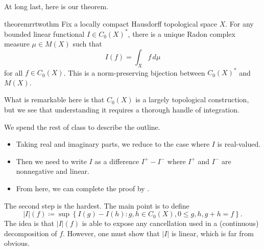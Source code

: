 \documentclass[../notes.tex]{subfiles}
\begin{document}
At long last, here is our theorem.
\begin{restatable}{theorem}{rrtwothm} \label{thm:rr-2}
	Fix a locally compact Hausdorff topological space $X$. For any bounded linear functional $I\in C_0(X)^*$, there is a unique Radon complex measure $\mu\in M(X)$ such that
	\[I(f)=\int_Xf\,d\mu\]
	for all $f\in C_0(X)$. This is a norm-preserving bijection between $C_0(X)^*$ and $M(X)$.
\end{restatable}
\noindent What is remarkable here is that $C_0(X)$ is a largely topological construction, but we see that understanding it requires a thorough handle of integration.

We spend the rest of class to describe the outline.
\begin{itemize}
	\item Taking real and imaginary parts, we reduce to the case where $I$ is real-valued.
	\item Then we need to write $I$ as a difference $I^+-I^-$ where $I^+$ and $I^-$ are nonnegative and linear.
	\item From here, we can complete the proof by .
\end{itemize}
The second step is the hardest. The main point is to define
\[\left|I\right|(f)\coloneqq\sup\left\{I(g)-I(h):g,h\in C_0(X),0\le g,h,g+h=f\right\}.\]
The idea is that $\left|I\right|(f)$ is able to expose any cancellation used in a (continuous) decomposition of $f$. However, one must show that $\left|I\right|$ is linear, which is far from obvious.
\end{document}
